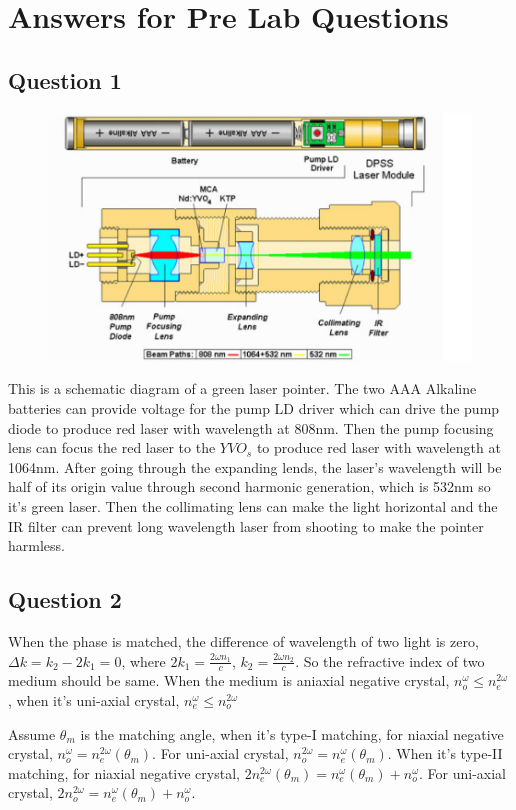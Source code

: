 \documentclass[12pt]{article}
\begin{document}
\newpage
\section{Answers for Pre Lab Questions}
\subsection{Question 1}
\begin{figure}[H]
\centering
\includegraphics[scale=0.5]{P1.png}
\end{figure}
This is a schematic diagram of a green laser pointer. The two AAA Alkaline batteries can provide voltage for the pump LD driver which can drive the pump diode to produce red laser with wavelength at 808nm. Then the pump focusing lens can focus the red laser to the $YVO_s$ to produce red laser with wavelength at 1064nm. After going through the expanding lends, the laser's wavelength will be half of its origin value through second harmonic generation, which is 532nm so it's green laser. Then the collimating lens can make the light horizontal and the IR filter can prevent long wavelength laser from shooting to make the pointer harmless.
\subsection{Question 2}
When the phase is matched, the difference of wavelength of two light is zero, $\Delta k=k_2-2k_1=0$, where $2k_1=\frac{2\omega n_1}{c}$, $k_2=\frac{2\omega n_2}{c}$. So the refractive index of two medium should be same. When the medium is aniaxial negative crystal, $n_o^\omega\leq n_e^{2\omega}$, when it's uni-axial crystal, $n_e^{\omega}\leq n_o^{2\omega}$
\par Assume $\theta_m$ is the matching angle, when it's type-I matching, for niaxial negative crystal, $n_o^{\omega}=n_e^{2\omega}(\theta_m)$. For uni-axial crystal, $n_o^{2\omega}=n_e^{\omega}(\theta_m)$. When it's type-II matching, for niaxial negative crystal, $2n_e^{2\omega}(\theta_m)=n_e^{\omega}(\theta_m)+n_o^{\omega}$. For uni-axial crystal, $2n_o^{2\omega}=n_e^{\omega}(\theta_m)+n_o^{\omega}$.
\end{document}
